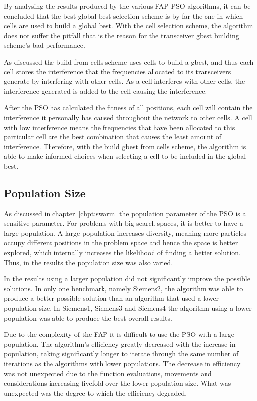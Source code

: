 By analysing the results produced by the various FAP PSO algorithms, it can be concluded that the best global best selection scheme is by far the one in which cells are used to build a global best. With the cell selection scheme, the algorithm does not suffer the pitfall that is the reason for the transceiver gbest building scheme's bad performance.

As discussed the build from cells scheme uses cells to build a gbest, and thus each cell stores the interference that the frequencies allocated to its transceivers generate by interfering with other cells. As a cell interferes with other cells, the interference generated is added to the cell causing the interference.

After the PSO has calculated the fitness of all positions, each cell will contain the interference it personally has caused throughout the network to other cells. A cell with low interference means the frequencies that have been allocated to this particular cell are the best combination that causes the least amount of interference. Therefore, with the build gbest from cells scheme, the algorithm is able to make informed choices when selecting a cell to be included in the global best. 
\subsection{Population Size}
As discussed in chapter~\ref{chpt:swarm} the population parameter of the PSO is a sensitive parameter. For problems with big search spaces, it is better to have a large population. A large population increases diversity, meaning more particles occupy different positions in the problem space and hence the space is better explored, which internally increases the likelihood of finding a better solution. Thus, in the results the population size was also varied.

In the results using a larger population did not significantly improve the possible solutions. In only one benchmark, namely Siemens2, the algorithm was able to produce a better possible solution than an algorithm that used a lower population size. In Siemens1, Siemens3 and Siemens4 the algorithm using a lower population was able to produce the best overall results.

Due to the complexity of the FAP it is difficult to use the PSO with a large population. The algorithm's efficiency greatly decreased with the increase in population, taking significantly longer to iterate through the same number of iterations as the algorithms with lower populations. The decrease in efficiency was not unexpected due to the function evaluations, movements and considerations increasing fivefold over the lower population size. What was unexpected was the degree to which the efficiency degraded.

